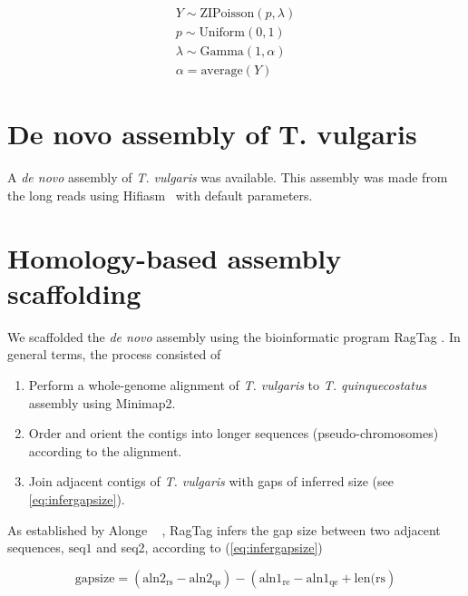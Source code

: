 \begin{subequations}
\label{eq:model}
\begin{align}
Y \sim \textrm{ZIPoisson}(p, \lambda) \label{eq:model1}\\
p \sim \textrm{Uniform}(0, 1) \label{eq:model2}\\
\lambda \sim \textrm{Gamma}(1, \alpha)  \label{eq:model3}\\
\alpha = \textrm{average}(Y) \label{eq:model4}
\end{align}   
\end{subequations}


\section*{De novo assembly of T. vulgaris}\label{sec:denovo}

A \textit{de novo} assembly of \textit{T. vulgaris} was available. This assembly was made from the long reads using Hifiasm~\cite{chengHaplotyperesolvedNovoAssembly2021} with default parameters.

\section*{Homology-based assembly scaffolding}\label{sec:scaffold}

We scaffolded the \textit{de novo} assembly using the bioinformatic program RagTag \cite{alongeAutomatedAssemblyScaffolding2022}. In general terms, the process consisted of 
\begin{enumerate}
    \item Perform a whole-genome alignment of \textit{T. vulgaris} to \textit{T. quinquecostatus} assembly using Minimap2. 
    \item Order and orient the contigs into longer sequences (pseudo-chromosomes) according to the alignment. 
    \item Join adjacent contigs of \textit{T. vulgaris} with gaps of inferred size (see \autoref{eq:infergapsize}). 
\end{enumerate}

As established by Alonge \etal ~ \cite{alongeAutomatedAssemblyScaffolding2022}, RagTag infers the gap size between two adjacent sequences, $\textrm{seq1}$ and \textrm{seq2}, according to (\ref{eq:infergapsize})

\begin{equation}\label{eq:infergapsize}
\textrm{gapsize}  = \left(\textrm{aln2}_\textrm{rs} - \textrm{aln2}_\textrm{qs}\right) - \left(\textrm{aln1}_\textrm{re} - \textrm{aln1}_\textrm{qe} + \textrm{len}(\textrm{rs}\right)
\end{equation}

